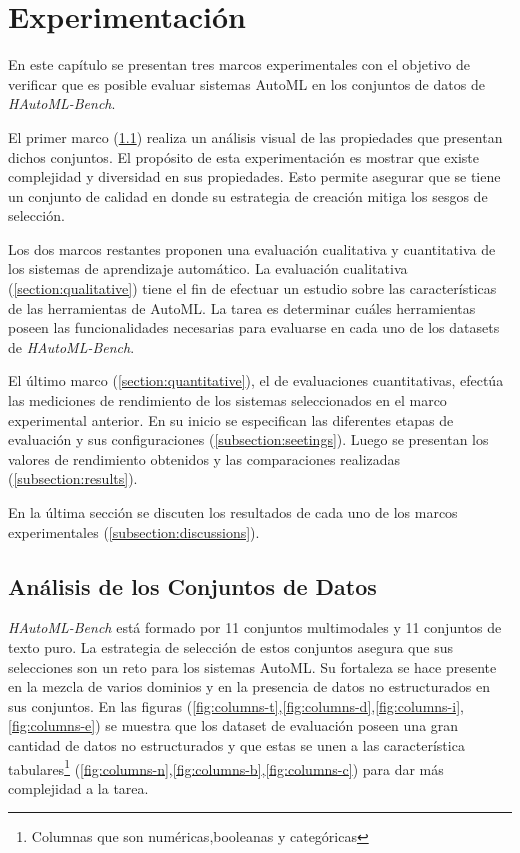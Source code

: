 \chapter{Experimentación}\label{chapter:experiments}

En este capítulo se presentan tres marcos experimentales con el objetivo de verificar que es posible evaluar sistemas AutoML en los conjuntos de datos de 
\textit{HAutoML-Bench}. 

El primer marco (\ref{section:data}) realiza un análisis visual de las propiedades que presentan dichos conjuntos. El propósito de esta experimentación es mostrar que 
existe complejidad y diversidad en sus propiedades. Esto permite asegurar que se tiene un conjunto de calidad en donde su estrategia de creación mitiga los sesgos de 
selección.

Los dos marcos restantes proponen una evaluación cualitativa y cuantitativa de los sistemas de aprendizaje automático.
La evaluación cualitativa (\ref{section:qualitative}) tiene el fin de efectuar un estudio sobre las características de las herramientas de AutoML. La tarea es determinar 
cuáles herramientas poseen las funcionalidades necesarias para evaluarse en cada uno de los datasets de \textit{HAutoML-Bench}.

El último marco (\ref{section:quantitative}), el de evaluaciones cuantitativas, efectúa las mediciones de rendimiento de los sistemas seleccionados en el marco experimental anterior. En su inicio 
se especifican las diferentes etapas de evaluación y sus configuraciones (\ref{subsection:seetings}). Luego se presentan los valores de 
rendimiento obtenidos y las comparaciones realizadas (\ref{subsection:results}).

En la última sección se discuten los resultados de cada uno de los marcos experimentales (\ref{subsection:discussions}).  

\section{Análisis de los Conjuntos de Datos}\label{section:data}

\textit{HAutoML-Bench} está formado por 11 conjuntos multimodales y 11 conjuntos de texto puro.
La estrategia de selección de estos conjuntos asegura que sus selecciones son un reto para los sistemas AutoML.
Su fortaleza se hace presente en la mezcla de varios dominios y en la presencia de datos no estructurados en sus conjuntos. 
En las figuras (\ref{fig:columns-t},\ref{fig:columns-d},\ref{fig:columns-i},\ref{fig:columns-e}) se muestra que los dataset de evaluación poseen una gran cantidad de 
datos no estructurados y que estas se unen a las característica 
tabulares\footnote{Columnas que son numéricas,booleanas y categóricas} (\ref{fig:columns-n},\ref{fig:columns-b},\ref{fig:columns-c}) para dar más complejidad a la tarea.

